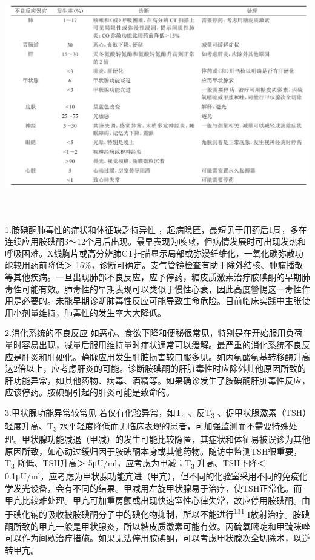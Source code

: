 \includegraphics[width=6.66667in,height=4in]{./images/Image00577.jpg}

1.胺碘酮肺毒性的症状和体征缺乏特异性
，起病隐匿，最短见于用药后1周，多在连续应用胺碘酮3～12个月后出现。最早表现为咳嗽，但病情发展时可出现发热和呼吸困难。X线胸片或高分辨肺CT扫描显示局部或弥漫纤维化，一氧化碳弥散功能较用药前降低＞
15\%，诊断可确定。支气管镜检查有助于除外结核、肿瘤播散等其他疾病。一旦出现肺部不良反应，应予停药，糖皮质激素治疗胺碘酮的早期肺毒性可能有效。肺毒性的早期表现可以类似于慢性心衰，因此高度警惕这一毒性作用是必要的。未能早期诊断肺毒性反应可能导致生命危险。目前临床实践中主张使用小剂量维持，肺毒性的发生率大大降低。

2.消化系统的不良反应
如恶心、食欲下降和便秘很常见，特别是在开始服用负荷量时容易出现，减量后服用维持量时症状通常可以缓解。最严重的消化系统不良反应是肝炎和肝硬化。静脉应用发生肝脏损害较口服多见。如丙氨酸氨基转移酶升高达2倍以上，应考虑肝炎的可能。诊断胺碘酮的肝脏毒性时应除外其他原因所致的肝功能异常，如其他药物、病毒、酒精等。如果确诊发生了胺碘酮肝脏毒性反应，应该停药。胺碘酮引起的肝炎可能是致命的。

3.甲状腺功能异常较常见 若仅有化验异常，如T\textsubscript{4}
、反T\textsubscript{3} 、促甲状腺激素（TSH）轻度升高、T\textsubscript{3}
水平轻度降低而无临床表现的患者，可加强监测而不需要特殊处理。甲状腺功能减退（甲减）的发生可能比较隐匿，其症状和体征易被误诊为其他原因所致，如心动过缓归因于胺碘酮本身或其他药物。随访中监测TSH很重要，T\textsubscript{3}
降低、TSH升高＞ 5μU/ml，应考虑为甲减；T\textsubscript{3} 升高、TSH下降＜
0.1μU/ml，应考虑为甲状腺功能亢进（甲亢），但不同的化验室采用不同的免疫化学发光设备，会有不同的结果。甲减用左旋甲状腺易于治疗，使TSH正常化。而甲亢比较难处理。甲亢可加重房颤或出现快速室性心律失常，故应停用胺碘酮。由于碘化钠的吸收被胺碘酮分子中的碘化物抑制，所以不能进行\textsuperscript{131}
I放射治疗。胺碘酮所致的甲亢一般是甲状腺炎，所以糖皮质激素可能有效。丙硫氧嘧啶和甲巯咪唑可以作为间歇治疗措施。如果无法停用胺碘酮，可以考虑甲状腺次全切除术，以逆转甲亢。

